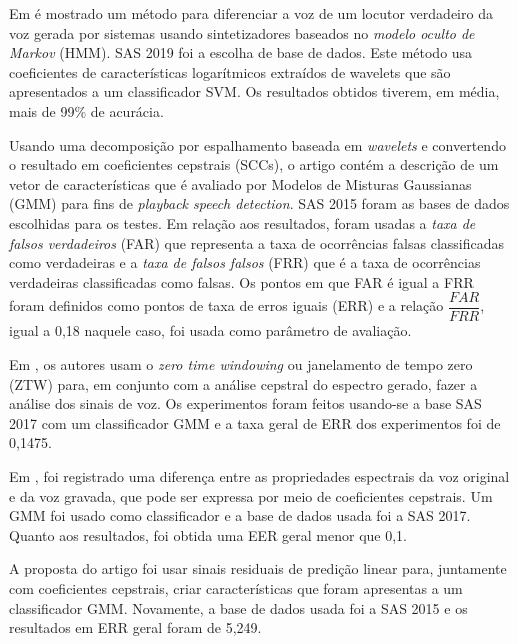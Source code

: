 		\par Em \cite{DiqunYan2019} é mostrado um método para diferenciar a voz de um locutor verdadeiro da voz gerada por sistemas usando sintetizadores baseados no \textit{modelo oculto de Markov} (HMM). SAS 2019\cite{SAS2019} foi a escolha de base de dados. Este método usa coeficientes de características logarítmicos extraídos de wavelets que são apresentados a um classificador SVM. Os resultados obtidos tiverem, em média, mais de 99\% de acurácia.\\

		\par Usando uma decomposição por espalhamento baseada em \textit{wavelets} e convertendo o resultado em coeficientes cepstrais (SCCs), o artigo \cite{7802552} contém a descrição de um vetor de características que é avaliado por Modelos de Misturas Gaussianas (GMM) para fins de \textit{playback speech detection}. SAS 2015 \cite{SAS2015} foram as bases de dados escolhidas para os testes. Em relação aos resultados, foram usadas a \textit{taxa de falsos verdadeiros} (FAR) que representa a taxa de ocorrências falsas classificadas como verdadeiras e a \textit{taxa de falsos falsos} (FRR) que é a taxa de ocorrências verdadeiras classificadas como falsas. Os pontos em que FAR é igual a FRR foram definidos como pontos de taxa de erros iguais (ERR) e a relação $\dfrac{FAR}{FRR}$, igual a 0,18 naquele caso, foi usada como parâmetro de avaliação.\\

		\par Em \cite{alluri2019replay}, os autores usam o \textit{zero time windowing} ou janelamento de tempo zero (ZTW) para, em conjunto com a análise cepstral do espectro gerado, fazer a análise dos sinais de voz. Os experimentos foram feitos usando-se a base SAS 2017\cite{SAS2017} com um classificador GMM e a taxa geral de ERR dos experimentos foi de 0,1475.\\
		
		\par Em \cite{8725688}, foi registrado uma diferença entre as propriedades espectrais da voz original e da voz gravada, que pode ser expressa por meio de coeficientes cepstrais. Um GMM foi usado como classificador e a base de dados usada foi a SAS 2017. Quanto aos resultados, foi obtida uma EER geral menor que 0,1.\\
	
		\par A proposta do artigo \cite{Hanilci2018} foi usar sinais residuais de predição linear para, juntamente com coeficientes cepstrais, criar características que foram apresentas a um classificador GMM. Novamente, a base de dados usada foi a SAS 2015 e os resultados em ERR geral foram de 5,249.\\

